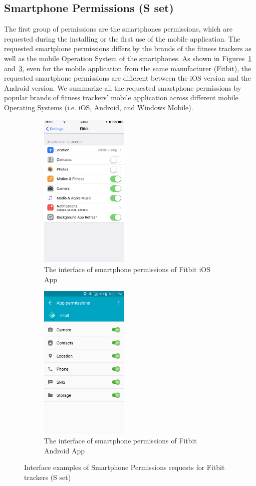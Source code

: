 \subsection{Smartphone Permissions (S set)}
The first group of permissions are the smartphones permissions, which are requested during the installing or the first use of the mobile application. The requested smartphone permissions differs by the brands of the fitness trackers as well as the mobile Operation System of the smartphones. As shown in Figures~\ref{fig:iosS} and~\ref{fig:androidS}, even for the mobile application from the same manufacturer (Fitbit), the requested smartphone permissions are different between the iOS version and the Android version. We summarize all the requested smartphone permissions by popular brands of fitness trackers' mobile application across different mobile Operating Systems (i.e. iOS, Android, and Windows Mobile).

\begin{figure}
	\centering
	\begin{subfigure}[b]{0.48\linewidth}
		\centering
		\includegraphics[width=120pt]{figures/ios.png}
		\caption{The interface of smartphone permissions of Fitbit iOS App}
		\label{fig:iosS}
	\end{subfigure}%
	\begin{subfigure}[b]{0.48\linewidth}
		\centering
		\includegraphics[width=120pt]{figures/android6.png}
		\caption{The interface of smartphone permissions of Fitbit Android App}
		\label{fig:androidS}
	\end{subfigure}
	\caption{Interface examples of Smartphone Permissions requests for Fitbit trackers (S set)}
\end{figure}

